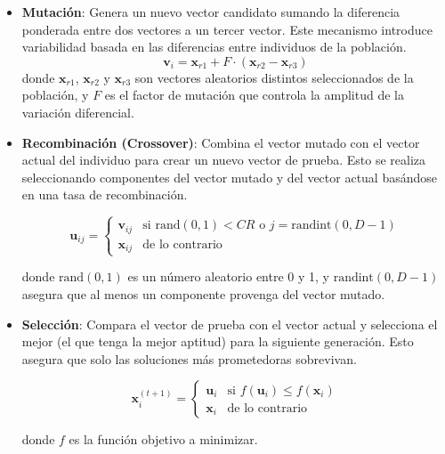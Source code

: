 \begin{itemize}
    \item \textbf{Mutación}: Genera un nuevo vector candidato sumando la diferencia ponderada entre dos vectores a un tercer vector. Este mecanismo introduce variabilidad basada en las diferencias entre individuos de la población.
    \begin{equation} \label{eq:mutacion}
        \mathbf{v}_i = \mathbf{x}_{r1} + F \cdot (\mathbf{x}_{r2} - \mathbf{x}_{r3})
    \end{equation}
    donde $\mathbf{x}_{r1}$, $\mathbf{x}_{r2}$ y $\mathbf{x}_{r3}$ son vectores aleatorios distintos seleccionados de la población, y $F$ es el factor de mutación que controla la amplitud de la variación diferencial.
    
    \item \textbf{Recombinación (Crossover)}: Combina el vector mutado con el vector actual del individuo para crear un nuevo vector de prueba. Esto se realiza seleccionando componentes del vector mutado y del vector actual basándose en una tasa de recombinación.
    
    \begin{equation}
        \mathbf{u}_{ij} = \begin{cases} 
        \mathbf{v}_{ij} & \text{si } \text{rand}(0,1) < CR \text{ o } j = \text{randint}(0,D-1) \\
        \mathbf{x}_{ij} & \text{de lo contrario}
        \end{cases}
    \end{equation}
    
    donde $\text{rand}(0,1)$ es un número aleatorio entre 0 y 1, y $\text{randint}(0,D-1)$ asegura que al menos un componente provenga del vector mutado.

    \item \textbf{Selección}: Compara el vector de prueba con el vector actual y selecciona el mejor (el que tenga la mejor aptitud) para la siguiente generación. Esto asegura que solo las soluciones más prometedoras sobrevivan.

    \begin{equation}
        \mathbf{x}_{i}^{(t+1)} = \begin{cases} 
        \mathbf{u}_i & \text{si } f(\mathbf{u}_i) \leq f(\mathbf{x}_i) \\
        \mathbf{x}_i & \text{de lo contrario}
        \end{cases}
    \end{equation}

    donde $f$ es la función objetivo a minimizar.
    
\end{itemize}


